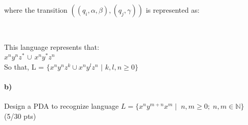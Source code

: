 \documentclass[a4paper,12pt]{article}
\begin{document}
\begin{minipage}{0.60\textwidth}
where the transition $((q_i,\alpha,\beta),(q_j,\gamma)) $ is represented as: 
\end{minipage}
\begin{minipage}{0.30\textwidth}
 \\
\end{minipage}


\begin{tcolorbox}
This language represents that:\\
$x^ny^nz^*$ $\cup$ $x^ny^*z^n$\\
So that, L = $\lbrace x^ny^nz^k \cup x^ny^lz^n$ $|$ $k,l,n \geq 0 \rbrace$\\
\end{tcolorbox}


\paragraph{b)} 
Design a PDA to recognize language $ L=\{x^n y^{m+n} x^m \mid \; n,m \geq 0; \; n,m \in \mathbb{N}  \} $  \hfill \small{(5/30 pts)} \\
\end{document}
